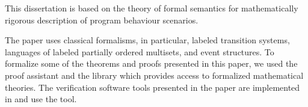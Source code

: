 {\methods} This dissertation is based on the theory of formal semantics for mathematically rigorous description of program behaviour scenarios.

The paper uses classical formalisms, in particular, labeled transition systems, languages of labeled partially ordered multisets, and event structures. To formalize some of the theorems and proofs presented in this paper, we used the \coq proof assistant and the \mathcomp library which provides access to formalized mathematical theories. The verification software tools presented in the paper are implemented in  \CLANG  and use the \genmc tool.



